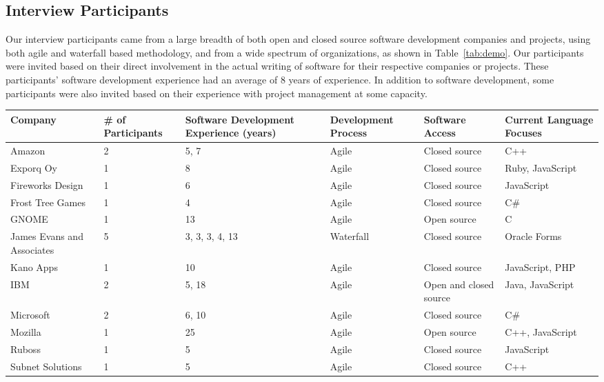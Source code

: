 \documentclass[conference]{IEEEtran}
\begin{document}
\subsection{Interview Participants}

Our interview participants came from a large breadth of both open and closed source software development companies
and projects, using both  agile and waterfall based methodology, and from a wide spectrum of organizations, as shown in Table~\ref{tab:demo}.
Our participants were invited based on their direct involvement in the actual writing of software for
their respective companies or projects. These participants' software development experience had an average of 8 years of experience.
In addition to software development, some participants were also invited based on their experience with project management
at some capacity.

\begin{table*}[tb!]
\begin{center}
\begin{tabular}{| l | p{1cm} | p{2cm} | p{2cm} | p{2cm} | p{2cm} |}
\hline
Company & \# of Participants & Software Development Experience (years) & Development Process & Software Access & Current Language Focuses \\
\hline
\hline
Amazon & 2 & 5, 7 & Agile & Closed source & C++ \\ \hline
Exporq Oy & 1 & 8 & Agile & Closed source & Ruby, JavaScript \\ \hline
Fireworks Design & 1 & 6 & Agile & Closed source & JavaScript \\ \hline
Frost Tree Games & 1 & 4 & Agile & Closed source & C\# \\ \hline
GNOME & 1 & 13 & Agile & Open source & C \\ \hline
James Evans and Associates & 5 & 3, 3, 3, 4, 13 & Waterfall & Closed source & Oracle Forms \\ \hline
Kano Apps & 1 & 10 & Agile & Closed source & JavaScript, PHP \\ \hline
IBM & 2 & 5, 18 & Agile & Open and closed source & Java, JavaScript \\ \hline
Microsoft & 2 & 6, 10 & Agile & Closed source & C\# \\ \hline
Mozilla & 1 & 25 & Agile & Open source & C++, JavaScript \\ \hline
Ruboss & 1 & 5 & Agile & Closed source & JavaScript \\ \hline
Subnet Solutions & 1 & 5 & Agile & Closed source & C++ \\ \hline

\end{tabular}
\end{center}
\caption{Demographic information of interview participants.\label{tab:demo}}
\end{table*}
\end{document}
